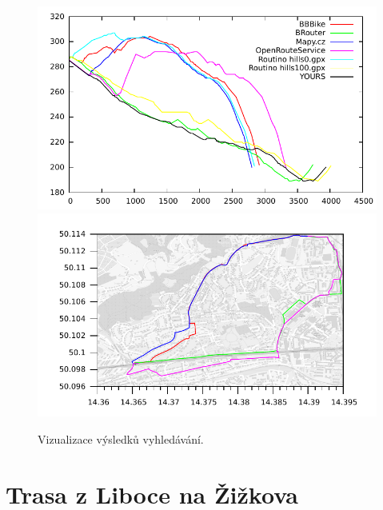 \documentclass[thesis=B,czech]{FITthesis}[2012/06/26]
\begin{document}
\begin{figure}[!ht]
\centering
\includegraphics[width=\columnwidth]{porovnani/ele-h.pdf}
\includegraphics[width=\columnwidth]{porovnani/ll-h.pdf}

\caption{Vizualizace výsledků vyhledávání. }
\label{img:hledani-h}
\end{figure}







\section{Trasa z Liboce na Žižkova}
\end{document}

